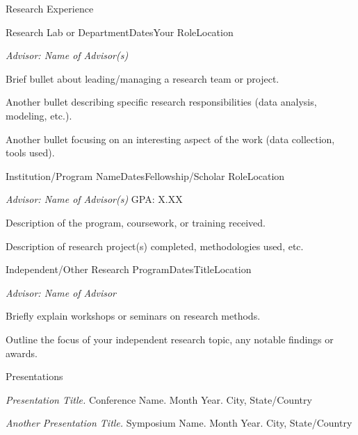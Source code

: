 \documentclass[
    11pt, %
]{resume} %
\begin{document}
\begin{rSection}{Research Experience}

\begin{rSubsection}{Research Lab or Department}{Dates}{Your Role}{Location}\vspace{-.5em}
\item[] \textit{Advisor: Name of Advisor(s)} 
\item Brief bullet about leading/managing a research team or project.
\item Another bullet describing specific research responsibilities (data analysis, modeling, etc.).
\item Another bullet focusing on an interesting aspect of the work (data collection, tools used).
\end{rSubsection}
\vspace{-.5em}

\begin{rSubsection}{Institution/Program Name}{Dates}{Fellowship/Scholar Role}{Location}\vspace{-.5em}
\item[] \textit{Advisor: Name of Advisor(s)} \hfill GPA: X.XX
\item Description of the program, coursework, or training received.
\item Description of research project(s) completed, methodologies used, etc.
\end{rSubsection}
\vspace{-.5em}

\begin{rSubsection}{Independent/Other Research Program}{Dates}{Title}{Location}\vspace{-.5em}
\item[] \textit{Advisor: Name of Advisor}
\item Briefly explain workshops or seminars on research methods.
\item Outline the focus of your independent research topic, any notable findings or awards.
\end{rSubsection}

\end{rSection}
\vspace{-.25em}

\begin{rSection}{Presentations}
\begin{description}
 \item \textit{Presentation Title.} Conference Name. Month Year. City, State/Country
 \item \textit{Another Presentation Title.} Symposium Name. Month Year. City, State/Country
\end{description}
\end{rSection}
\vspace{-.25em}
\end{document}

